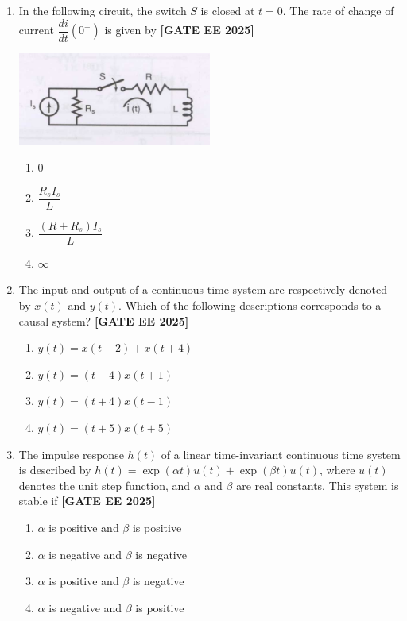 \documentclass[12pt,a4paper]{article}
\begin{document}
\begin{enumerate}[leftmargin=2.5em, label=\textbf{Q.\arabic*}., itemsep=2em]
\item In the following circuit, the switch $S$ is closed at $t = 0$. The rate of change of current $\dfrac{di}{dt}(0^+)$ is given by
\newline
\noindent \textbf{[GATE EE 2025]}
\begin{center}
\includegraphics[width=0.5\textwidth]{figs/q8.png}
\end{center}
\begin{enumerate}[label=(\Alph*)]
    \item 0
    \item $\dfrac{R_s I_s}{L}$
    \item $\dfrac{(R+R_s) I_s}{L}$
    \item $\infty$
\end{enumerate}

\item The input and output of a continuous time system are respectively denoted by $x(t)$ and $y(t)$. Which of the following descriptions corresponds to a causal system?
\newline
\noindent \textbf{[GATE EE 2025]}
\begin{enumerate}[label=(\Alph*)]
    \item $y(t) = x(t-2) + x(t+4)$
    \item $y(t) = (t-4) x(t+1)$
    \item $y(t) = (t+4) x(t-1)$
    \item $y(t) = (t+5) x(t+5)$
\end{enumerate}

\item The impulse response $h(t)$ of a linear time-invariant continuous time system is described by $h(t) = \exp(\alpha t) u(t) + \exp(\beta t) u(t)$, where $u(t)$ denotes the unit step function, and $\alpha$ and $\beta$ are real constants. This system is stable if
\newline
\noindent \textbf{[GATE EE 2025]}
\begin{enumerate}[label=(\Alph*)]
    \item $\alpha$ is positive and $\beta$ is positive
    \item $\alpha$ is negative and $\beta$ is negative
    \item $\alpha$ is positive and $\beta$ is negative
    \item $\alpha$ is negative and $\beta$ is positive
\end{enumerate}


\end{enumerate}
\end{document}
